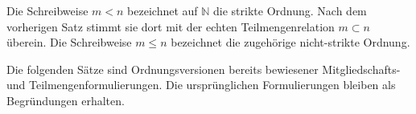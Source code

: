\documentclass[main.tex]{subfiles}
\begin{document}

\begin{remark}
  Die Schreibweise \(m < n\) bezeichnet auf \(\mathbb{N}\) die strikte Ordnung. Nach dem vorherigen Satz stimmt sie dort mit der echten Teilmengenrelation \(m\subset n\) überein. Die Schreibweise \(m\leq n\) bezeichnet die zugehörige nicht-strikte Ordnung.
\end{remark}

\begin{tabproof}
\end{tabproof}

\begin{tabproof}
\end{tabproof}

\begin{remark}
  Die folgenden Sätze sind Ordnungsversionen bereits bewiesener Mitgliedschafts- und Teilmengenformulierungen. Die ursprünglichen Formulierungen bleiben als Begründungen erhalten.
\end{remark}
\end{document}
